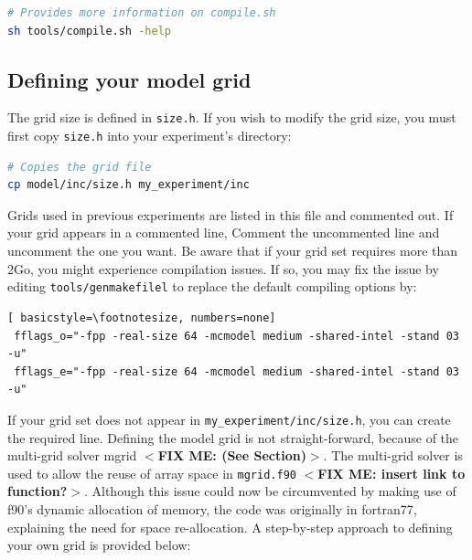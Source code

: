 \documentclass[12pt,letterpaper,titlepage]{article}
\newcommand{\fixme}[1]{\color{red}$<$\textbf{FIX ME: #1}$>$\color{black}}
\begin{document}
\begin{lstlisting}[language=sh]
# Provides more information on compile.sh
sh tools/compile.sh -help
\end{lstlisting}

\subsection{Defining your model grid}

The grid size is defined in \texttt{size.h}. If you wish to modify the grid size, you must first copy \texttt{size.h} into your experiment's directory:

\begin{lstlisting}[language=sh]
# Copies the grid file
cp model/inc/size.h my_experiment/inc
\end{lstlisting}

Grids used in previous experiments are listed in this file and commented out. If your grid appears in a commented line, Comment the uncommented line and uncomment the one you want. Be aware that if your grid set requires more than 2Go, you might experience compilation issues. If so, you may fix the issue by editing \texttt{tools/genmakefilel} to replace the default compiling options by:

\begin{lstlisting}[	basicstyle=\footnotesize, numbers=none]
 fflags_o="-fpp -real-size 64 -mcmodel medium -shared-intel -stand 03 -u" 
 fflags_e="-fpp -real-size 64 -mcmodel medium -shared-intel -stand 03 -u" 
\end{lstlisting}

If your grid set does not appear in \texttt{my\_experiment/inc/size.h}, you can create the required line. Defining the model grid is not straight-forward, because of the multi-grid solver mgrid \fixme{(See Section)}. The multi-grid solver is used to allow the reuse of array space in \texttt{mgrid.f90} \fixme{insert link to function?}. Although this issue could now be circumvented by making use of f90's dynamic allocation of memory, the code was originally in fortran77, explaining the need for space re-allocation. A step-by-step approach to defining your own grid is provided below:
\end{document}
